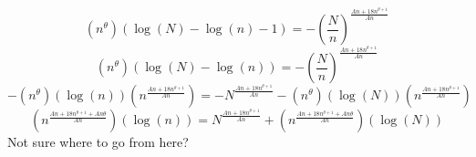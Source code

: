 \documentclass{article}
\newcommand{\aadit}[1]{\begingroup\color{orange}#1\endgroup}
\begin{document}
\begin{equation}
(n^\theta) (\log(N) - \log(n) - 1) = -\left( \frac{N}{n} \right)^{\frac{A n + 18 n^{\theta + 1}}{A n}}
\end{equation}
\begin{equation}
(n^\theta) (\log(N) - \log(n)) = -\left( \frac{N}{n} \right)^{\frac{A n + 18 n^{\theta + 1}}{A n}}
\end{equation}
\begin{equation}
-(n^\theta) ( \log(n)) (n^{\frac{A n + 18 n^{\theta + 1}}{A n}}) = -N ^{\frac{A n + 18 n^{\theta + 1}}{A n}} - (n^\theta) ( \log(N)) (n^{\frac{A n + 18 n^{\theta + 1}}{A n}})
\end{equation}
\begin{equation}
(n^{\frac{A n + 18 n^{\theta + 1} + An\theta}{A n}}) ( \log(n))  = N ^{\frac{A n + 18 n^{\theta + 1}}{A n}} + (n^{\frac{A n + 18 n^{\theta + 1} + An\theta}{A n}}) ( \log(N))
\end{equation}
\aadit{Not sure where to go from here?}



\end{document}
